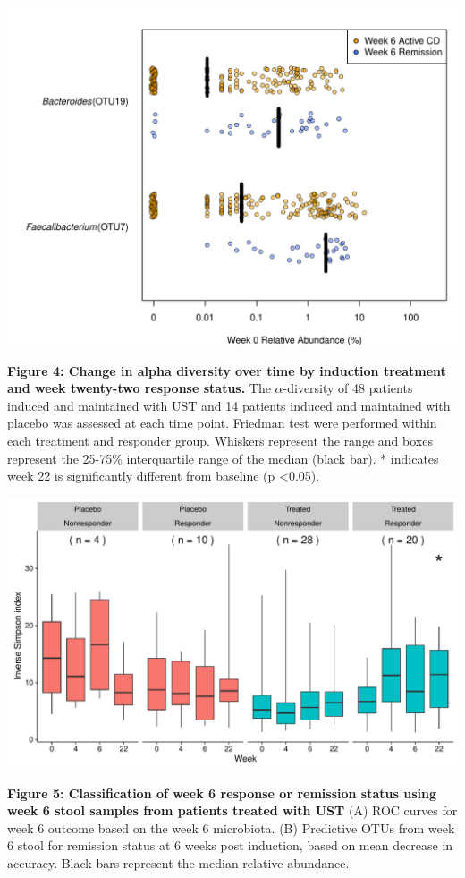 \documentclass[12pt,]{article}
\begin{document}
\includegraphics{figures/Figure3_basesigOTUabund.REMISSwk6.pdf}

\newpage

\textbf{Figure 4: Change in alpha diversity over time by induction
treatment and week twenty-two response status.} The
\({\alpha}\)-diversity of 48 patients induced and maintained with UST
and 14 patients induced and maintained with placebo was assessed at each
time point. Friedman test were performed within each treatment and
responder group. Whiskers represent the range and boxes represent the
25-75\% interquartile range of the median (black bar). * indicates week
22 is significantly different from baseline (p \textless{}0.05).

\includegraphics{figures/Figure4_alltp.adivXvisitXindtrtXrelRSPwk22.pdf}

\newpage

\textbf{Figure 5: Classification of week 6 response or remission status
using week 6 stool samples from patients treated with UST} (A) ROC
curves for week 6 outcome based on the week 6 microbiota. (B) Predictive
OTUs from week 6 stool for remission status at 6 weeks post induction,
based on mean decrease in accuracy. Black bars represent the median
relative abundance.
\end{document}
